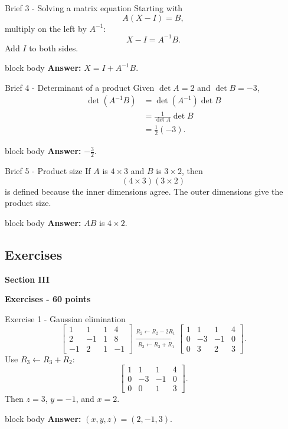 \documentclass[aspectratio=169]{beamer}
\newcommand{\sectioncard}[2]{%
  \begin{frame}[plain]
    \vfill\centering
    {\Huge\color{lectureorange}\bfseries #1}\par\bigskip
    {\LARGE\color{lecturegreen}\bfseries #2}
    \vfill
  \end{frame}}
\newcommand{\answerbox}[1]{%
  \begin{beamercolorbox}[sep=1.0ex,wd=\linewidth]{block body}
    \textbf{Answer:} #1
  \end{beamercolorbox}}
\begin{document}
\begin{frame}{Brief 3 - Solving a matrix equation}
Starting with
\[
A(X-I)=B,
\]
multiply on the left by $A^{-1}$:
\[
X-I=A^{-1}B.
\]
Add $I$ to both sides.
\answerbox{$\boxed{X=I+A^{-1}B}$.}
\end{frame}

\begin{frame}{Brief 4 - Determinant of a product}
Given $\det A=2$ and $\det B=-3$,
\begin{align*}
\det(A^{-1}B)
&=\det(A^{-1})\det B\\
&=\frac{1}{\det A}\det B\\
&=\frac12(-3).
\end{align*}
\answerbox{$\boxed{-\frac32}$.}
\end{frame}

\begin{frame}{Brief 5 - Product size}
If $A$ is $4\times3$ and $B$ is $3\times2$, then
\[
(4\times3)(3\times2)
\]
is defined because the inner dimensions agree. The outer dimensions give the product size.
\answerbox{$AB$ is $\boxed{4\times2}$.}
\end{frame}

\subsection{Exercises}
\sectioncard{Section III}{Exercises - 60 points}

\begin{frame}{Exercise 1 - Gaussian elimination}
\small
\[
\left[\begin{array}{ccc|c}
1&1&1&4\\2&-1&1&8\\-1&2&1&-1
\end{array}\right]
\xrightarrow[\ R_3\leftarrow R_3+R_1]{R_2\leftarrow R_2-2R_1}
\left[\begin{array}{ccc|c}
1&1&1&4\\0&-3&-1&0\\0&3&2&3
\end{array}\right].
\]
Use $R_3\leftarrow R_3+R_2$:
\[
\left[\begin{array}{ccc|c}
1&1&1&4\\0&-3&-1&0\\0&0&1&3
\end{array}\right].
\]
Then $z=3$, $y=-1$, and $x=2$.
\answerbox{$\boxed{(x,y,z)=(2,-1,3)}$.}
\end{frame}
\end{document}
